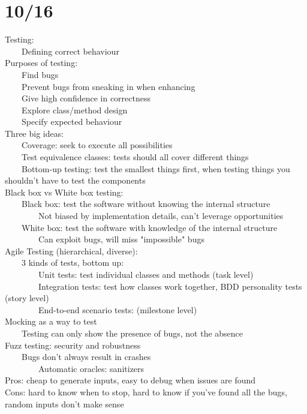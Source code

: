 \documentclass[10pt,letterpaper,unboxed,cm]{article}
\newcommand{\tab}{~~~~}
\begin{document}
\section{10/16}
Testing:\\
\tab Defining correct behaviour\\
Purposes of testing: \\
\tab Find bugs\\
\tab Prevent bugs from sneaking in when enhancing\\
\tab Give high confidence in correctness\\
\tab Explore class/method design\\
\tab Specify expected behaviour\\
Three big ideas: \\
\tab Coverage: seek to execute all possibilities\\
\tab Test equivalence classes: tests should all cover different things\\
\tab Bottom-up testing: test the smallest things first, when testing things you shouldn't have to test the components\\
Black box vs White box testing: \\
\tab Black box: test the software without knowing the internal structure\\
\tab \tab Not biased by implementation details, can't leverage opportunities\\
\tab White box: test the software with knowledge of the internal structure\\
\tab \tab Can exploit bugs, will miss "impossible" bugs\\
Agile Testing (hierarchical, diverse): \\
\tab 3 kinds of tests, bottom up: \\
\tab \tab Unit tests: test individual classes and methods (task level)\\
\tab \tab Integration tests: test how classes work together, BDD personality tests (story level)\\
\tab \tab End-to-end scenario tests: (milestone level)\\
Mocking as a way to test\\
\tab Testing can only show the presence of bugs, not the absence\\
Fuzz testing: security and robustness\\
\tab Bugs don't always result in crashes\\
\tab \tab Automatic oracles: sanitizers\\
Pros: cheap to generate inputs, easy to debug when issues are found\\
Cons: hard to know when to stop, hard to know if you've found all the bugs, random inputs don't make sense\\
\end{document}
